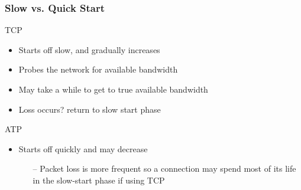 \begin{frame}[t]
  \frametitle{Slow vs. Quick Start}

  TCP
  \begin{itemize}
    \item Starts off slow, and gradually increases
    \item Probes the network for available bandwidth
    \item May take a while to get to true available bandwidth
    \item Loss occurs? return to slow start phase
  \end{itemize}

  \vfill
  
  ATP
  \begin{itemize}
  \item Starts off quickly and may decrease
    \begin{itemize}
    \item[--]Packet loss is more frequent so a connection may spend most of its life in the slow-start phase if using TCP
    \end{itemize}
  \end{itemize}
  
    \vfill

  \begin{flushleft}
    \begin{tiny}
      \begin{minipage}{1.0\linewidth}
      \end{minipage}
    \end{tiny}
  \end{flushleft}
  
\end{frame}

